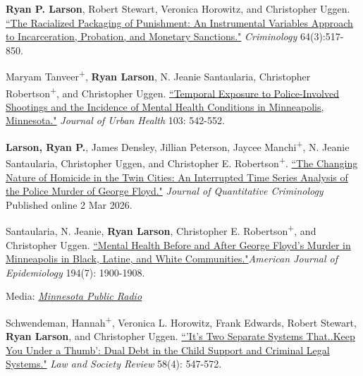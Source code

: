\documentclass[letterpaper]{article}
\newenvironment{publist}{%
  \begin{list}{}{%
    \setlength{\leftmargin}{0cm}   %
    \setlength{\labelwidth}{2cm}     %
    \setlength{\labelsep}{0.5cm}     %
  }%
}{%
  \end{list}%
}
\renewenvironment{itemize}{
  \begin{list}{}{
    \setlength{\leftmargin}{1.5em}
  }
}{
  \end{list}
}
\begin{document}
\begin{publist}

\item[\textbf{2026}] \textbf{Ryan P. Larson}, Robert Stewart, Veronica Horowitz, and Christopher Uggen. \href{https://ryanplarson.github.io/personal_site/pubs/larson_etal_26_crim.pdf}{``The Racialized Packaging of Punishment: An Instrumental Variables Approach to Incarceration, Probation, and Monetary Sanctions."} \textit{Criminology} 64(3):517-850.

\item Maryam Tanveer\textsuperscript{+}, \textbf{Ryan Larson}, N. Jeanie Santaularia, Christopher Robertson\textsuperscript{+}, and Christopher Uggen. \href{https://ryanplarson.github.io/personal_site/pubs/tanveer_etal_26.pdf}{``Temporal Exposure to Police-Involved Shootings and the Incidence of Mental Health Conditions in Minneapolis, Minnesota."} \textit{Journal of Urban Health} 103: 542-552.

\item \textbf{Larson, Ryan P.}, James Densley, Jillian Peterson, Jaycee Manchi\textsuperscript{+}, N. Jeanie Santaularia, Christopher Uggen, and Christopher E. Robertson\textsuperscript{+}. \href{https://ryanplarson.github.io/personal_site/pubs/larson_etal_26_jqc.pdf}{``The Changing Nature of Homicide in the Twin Cities: An Interrupted Time Series Analysis of the Police Murder of George Floyd."}  \textit{Journal of Quantitative Criminology} Published online 2 Mar 2026.

\item[\textbf{2025}]  Santaularia, N. Jeanie, \textbf{Ryan Larson}, Christopher E. Robertson\textsuperscript{+}, and Christopher Uggen. \href{https://ryanplarson.github.io/personal_site/pubs/santaularia_etal_25_final.pdf}{``Mental Health Before and After George Floyd’s Murder in Minneapolis in Black, Latine, and White Communities."}\textit{American Journal of Epidemiology} 194(7): 1900-1908. 

\begin{itemize}
\item Media: \href{https://www.mprnews.org/story/2024/09/19/black-minneapolis-residents-bear-heaviest-mental-health-burden-after-george-floyds-murder}{\textit{Minnesota Public Radio}}
\end{itemize}

\item[\textbf{2024}] Schwendeman, Hannah\textsuperscript{+}, Veronica L. Horowitz, Frank Edwards, Robert Stewart, \textbf{Ryan Larson}, and Christopher Uggen. \href{https://ryanplarson.github.io/personal_site/pubs/schwendeman_etal_24.pdf}{``'It's Two Separate Systems That..Keep You Under a Thumb': Dual Debt in the Child Support and Criminal Legal Systems."} \textit{Law and Society Review} 58(4): 547-572. 


\end{publist}
\end{document}
